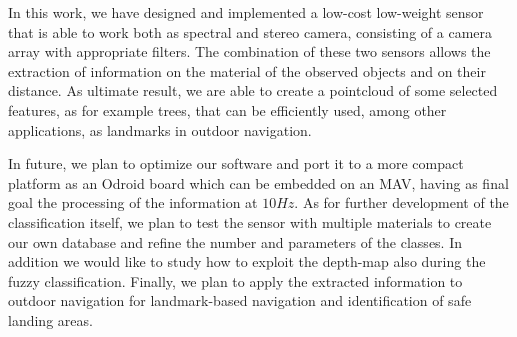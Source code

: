 \documentclass[letterpaper, 10pt, conference]{ieeeconf}      %
\begin{document}
In this work, we have designed and implemented a low-cost low-weight sensor that is able to work both as spectral and stereo camera, consisting of a camera array with appropriate filters.
The combination of these two sensors allows the extraction of information on the material of the observed objects and on their distance.
As ultimate result, we are able to create a pointcloud of some selected features, as for example trees,  that can be efficiently used, among other applications, as landmarks in outdoor navigation.

In future, we plan to optimize our software and port it to a more compact platform as an Odroid board which can be embedded on an MAV, having as final goal the processing of the information at $10Hz$.
As for further development of the classification itself, we plan to test the sensor with multiple materials to create our own database and refine the number and parameters of the classes.
In addition we would like to study how to exploit the depth-map also during the fuzzy classification.
Finally, we plan to apply the extracted information to outdoor navigation for landmark-based navigation and identification of safe landing areas.






























   













\end{document}
